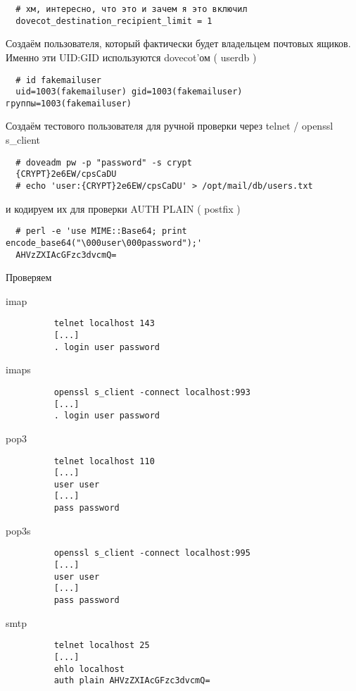 \documentclass[a4paper,10pt]{report}
\begin{document}
\begin{enumerate}
\begin{verbatim}
  # хм, интересно, что это и зачем я это включил
  dovecot_destination_recipient_limit = 1
  \end{verbatim}
  Создаём пользователя, который фактически будет владельцем почтовых ящиков. Именно эти UID:GID используются dovecot'ом ( userdb )
  \begin{verbatim}
  # id fakemailuser
  uid=1003(fakemailuser) gid=1003(fakemailuser) группы=1003(fakemailuser)
  \end{verbatim}
  Создаём тестового пользователя для ручной проверки через telnet / openssl s\_client
  \begin{verbatim}
  # doveadm pw -p "password" -s crypt
  {CRYPT}2e6EW/cpsCaDU
  # echo 'user:{CRYPT}2e6EW/cpsCaDU' > /opt/mail/db/users.txt 
  \end{verbatim}
  и кодируем их для проверки AUTH PLAIN ( postfix )
  \begin{verbatim}
  # perl -e 'use MIME::Base64; print encode_base64("\000user\000password");'
  AHVzZXIAcGFzc3dvcmQ=
  \end{verbatim}
  Проверяем
  \begin{description}
    \item[imap] \begin{verbatim}
    telnet localhost 143
    [...]
    . login user password 
    \end{verbatim}
    \item[imaps] \begin{verbatim}
    openssl s_client -connect localhost:993
    [...]
    . login user password 
    \end{verbatim}
    \item[pop3] \begin{verbatim}
    telnet localhost 110
    [...]
    user user
    [...]
    pass password
    \end{verbatim}
    \item[pop3s] \begin{verbatim}
    openssl s_client -connect localhost:995
    [...]
    user user
    [...]
    pass password
    \end{verbatim}
    \item[smtp] \begin{verbatim}
    telnet localhost 25
    [...]
    ehlo localhost
    auth plain AHVzZXIAcGFzc3dvcmQ=
    \end{verbatim}

\end{description}
\end{enumerate}
\end{document}
